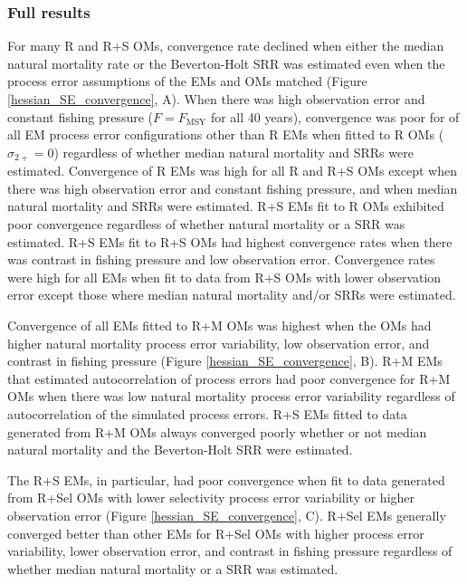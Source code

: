 \documentclass[
  12pt,
]{article}
\begin{document}
\subsubsection*{Full results}\label{full-results}

For many R and R+S OMs, convergence rate declined when either the median
natural mortality rate or the Beverton-Holt SRR was estimated even when
the process error assumptions of the EMs and OMs matched (Figure
\ref{hessian_SE_convergence}, A). When there was high observation error
and constant fishing pressure (\(F = F_{\text{MSY}}\) for all 40 years),
convergence was poor for of all EM process error configurations other
than R EMs when fitted to R OMs (\(\sigma_{2+} = 0\)) regardless of
whether median natural mortality and SRRs were estimated. Convergence of
R EMs was high for all R and R+S OMs except when there was high
observation error and constant fishing pressure, and when median natural
mortality and SRRs were estimated. R+S EMs fit to R OMs exhibited poor
convergence regardless of whether natural mortality or a SRR was
estimated. R+S EMs fit to R+S OMs had highest convergence rates when
there was contrast in fishing pressure and low observation error.
Convergence rates were high for all EMs when fit to data from R+S OMs
with lower observation error except those where median natural mortality
and/or SRRs were estimated.

Convergence of all EMs fitted to R+M OMs was highest when the OMs had
higher natural mortality process error variability, low observation
error, and contrast in fishing pressure (Figure
\ref{hessian_SE_convergence}, B). R+M EMs that estimated autocorrelation
of process errors had poor convergence for R+M OMs when there was low
natural mortality process error variability regardless of
autocorrelation of the simulated process errors. R+S EMs fitted to data
generated from R+M OMs always converged poorly whether or not median
natural mortality and the Beverton-Holt SRR were estimated.

The R+S EMs, in particular, had poor convergence when fit to data
generated from R+Sel OMs with lower selectivity process error
variability or higher observation error (Figure
\ref{hessian_SE_convergence}, C). R+Sel EMs generally converged better
than other EMs for R+Sel OMs with higher process error variability,
lower observation error, and contrast in fishing pressure regardless of
whether median natural mortality or a SRR was estimated.
\end{document}
